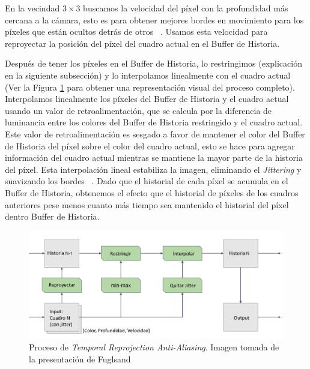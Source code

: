 \documentclass[pregrado]{tesis-usb} %
\begin{document}
En la vecindad $3\times 3$ buscamos la velocidad del píxel con la profundidad más cercana a la cámara, esto es para obtener mejores bordes en movimiento para los píxeles que están ocultos detrás de otros ~\cite{Fuglsand2016}. Usamos esta velocidad para reproyectar la posición del píxel del cuadro actual en el Buffer de Historia. ~\cite{Fuglsand2016, XU2016}

Después de tener los píxeles en el Buffer de Historia, lo restringimos (explicación en la siguiente subsección) y lo interpolamos linealmente con el cuadro actual (Ver la Figura \ref{fig:samplingprocess} para obtener una representación visual del proceso completo). Interpolamos linealmente los píxeles del Buffer de Historia y el cuadro actual usando un valor de retroalimentación, que se calcula por la diferencia de luminancia entre los colores del Buffer de Historia restringido y el cuadro actual. Este valor de retroalimentación es sesgado a favor de mantener el color del Buffer de Historia del píxel sobre el color del cuadro actual, esto se hace para agregar información del cuadro actual mientras se mantiene la mayor parte de la historia del píxel. Esta interpolación lineal estabiliza la imagen, eliminando el \textit{Jittering} y suavizando los bordes ~\cite{Fuglsand2016, XU2016}. Dado que el historial de cada píxel se acumula en el Buffer de Historia, obtenemos el efecto que el historial de píxeles de los cuadros anteriores pese menos cuanto más tiempo sea mantenido el historial del píxel dentro Buffer de Historia. ~\cite{Fuglsand2016}

\begin{figure}[H]
	\centering
	\includegraphics[scale=0.4]{images/sampling_process.png}
	\caption{Proceso de \textit{Temporal Reprojection Anti-Aliasing}. Imagen tomada de la presentación de Fuglsand \protect\cite{Fuglsand2016}}\label{fig:samplingprocess}
\end{figure}
\end{document}
